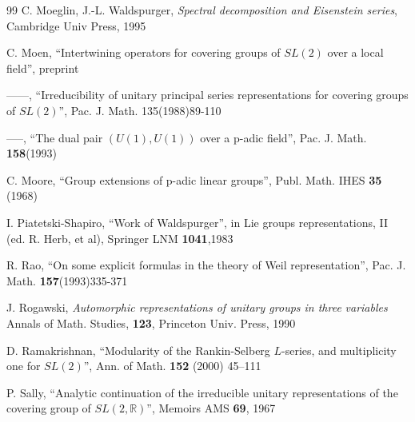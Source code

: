\documentclass[12pt,letterpaper,openany]{book}
\theoremstyle{plain}
\theoremstyle{definition}
\theoremstyle{remark}
\theoremstyle{remark}
\begin{document}
\begin{thebibliography}{99}
 C. Moeglin, J.-L. Waldspurger,
\emph{Spectral decomposition and Eisenstein series},
Cambridge Univ Press, 1995

 C. Moen, ``Intertwining operators for covering groups
of $SL(2)$ over
a local field'', preprint

 ------, ``Irreducibility of unitary principal series
representations
for covering groups of $SL(2)$'', Pac. J. Math. 135(1988)89-110

 -----, ``The dual pair $(U(1),U(1))$ over a p-adic field'',
Pac. J. Math. \textbf{158}(1993)

 C. Moore, ``Group extensions of p-adic linear groups'',
Publ. Math. IHES \textbf{35} (1968)


 I. Piatetski-Shapiro, ``Work of Waldspurger'', in Lie groups
representations, II (ed. R. Herb, et al), Springer LNM
\textbf{1041},1983



 R. Rao, ``On some explicit formulas in the theory
of Weil representation'', Pac. J. Math. \textbf{157}(1993)335-371


 J. Rogawski,
\emph{Automorphic representations of unitary groups
in three} \emph{variables}
Annals of Math. Studies, \textbf{123}, Princeton Univ. Press, 1990


 D. Ramakrishnan, ``Modularity of the Rankin-Selberg
$L$-series, and multiplicity one for $SL(2)$'', Ann. of Math.
\textbf{152} (2000) 45--111

 P. Sally, ``Analytic continuation of the irreducible unitary
representations of the covering group of $SL(2,{\mathbb{R}})$'', Memoirs AMS
\textbf{69}, 1967


\end{thebibliography}
\end{document}

